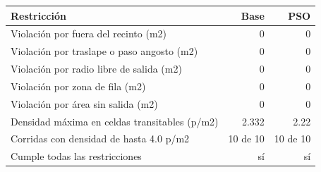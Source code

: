 \begin{tabular}{lrr}
\toprule
Restricción & Base & PSO \\
\midrule
Violación por fuera del recinto (m2) & 0 & 0 \\
Violación por traslape o paso angosto (m2) & 0 & 0 \\
Violación por radio libre de salida (m2) & 0 & 0 \\
Violación por zona de fila (m2) & 0 & 0 \\
Violación por área sin salida (m2) & 0 & 0 \\
Densidad máxima en celdas transitables (p/m2) & 2.332 & 2.22 \\
Corridas con densidad de hasta 4.0 p/m2 & 10 de 10 & 10 de 10 \\
Cumple todas las restricciones & sí & sí \\
\bottomrule
\end{tabular}
